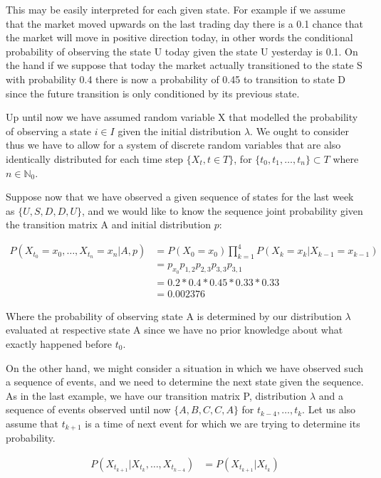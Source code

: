  
This may be easily interpreted for each given state. For example if we assume that the market moved upwards on the last trading day there is a 0.1 chance that the market will move in positive direction today, in other words the conditional probability of observing the state U today given the state U yesterday is 0.1. 
On the hand if we suppose that today the market actually transitioned to the state S with probability 0.4 there is now a probability of 0.45 to transition to state D since the future transition is only conditioned by its previous state. 

Up until now we have assumed random variable X that modelled the probability of observing a state $i \in I$ given the initial distribution $\lambda$. We ought to consider  thus we have to allow for a system of discrete random variables that are also identically distributed for each time step $\{X_{t},t \in T \}$, for $\{t_0,t_1,\ldots,t_n\} \subset T$ where $n \in \mathbb{N}_0$.

Suppose now that we have observed a given sequence of states for the last week as $\{U,S,D,D,U\}$, and we would like to know the sequence joint probability given the transition matrix A and initial distribution $p$:

\begin{align*}
P(X_{t_0} = x_0,\ldots,X_{t_n} = x_n|A,p) &= P(X_0 = x_0) \prod_{k=1}^4 P(X_k=x_k|X_{k-1}=x_{k-1})\\
&= p_{x_0} p_{1,2}  p_{2,3}  p_{3,3} p_{3,1} \\
&= 0.2 * 0.4 * 0.45 * 0.33 * 0.33 \\
&= 0.002376
\end{align*}

Where the probability of observing state A is determined by our distribution $\lambda$ evaluated at respective state A since we have no prior knowledge about what exactly happened before $t_0$. 

On the other hand, we might consider a situation in which we have observed such a sequence of events, and we need to determine the next state given the sequence. As in the last example, we have our transition matrix P, distribution $\lambda$ and a sequence of events observed until now $\{A,B,C,C,A\}$ for $t_{k-4},\ldots,t_{k}$. Let us also assume that $t_{k+1}$ is a time of next event for which we are trying to determine its probability.

\begin{align}
P(X_{t_{k+1}}|X_{t_{k}},\ldots,X_{t_{k-4}}) &= P(X_{t_{k+1}}|X_{t_{k}})
\end{align}

